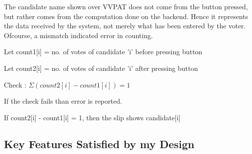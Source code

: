 \documentclass[11pt]{article}
\begin{document}
    The candidate name shown over VVPAT does not come from the button pressed, but rather comes from the computation done on the backend. Hence it represents the data received by the system, not merely what has been entered by the voter. Ofcourse, a mismatch indicated error in counting.

    \line

    Let count1[i] = no. of votes of candidate 'i' before pressing button
    
    \line
    
    Let count2[i] = no. of votes of candidate 'i' after pressing button
    
    \line
    
    Check : $\Sigma (count2[i] - count1[i]) = 1$
    
    \line
    
    If the check fails than error is reported.
    
    \line
    
    If count2[i] - count1[i] = 1, then the slip shows candidate[i]
    
    
    \subsection{Key Features Satisfied by my Design}
    
\end{document}

